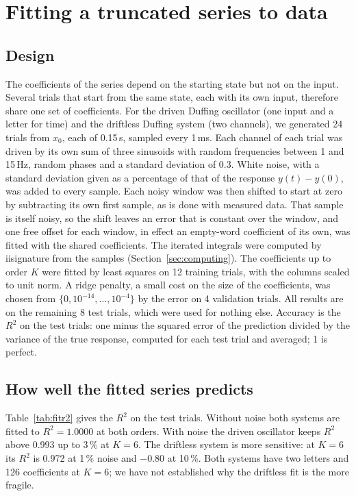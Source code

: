 \documentclass[11pt,a4paper]{article}
\theoremstyle{remark}
\begin{document}
\section{Fitting a truncated series to data}\label{sec:regression}
\subsection{Design}\label{sec:regression-design}
The coefficients of the series depend on the starting state but not on the input.
Several trials that start from the same state, each with its own input, therefore share one set of coefficients.
For the driven Duffing oscillator (one input and a letter for time) and the driftless Duffing system (two channels), we generated 24 trials from $x_0$, each of 0.15\,s, sampled every 1\,ms.
Each channel of each trial was driven by its own sum of three sinusoids with random frequencies between 1 and 15\,Hz, random phases and a standard deviation of 0.3.
White noise, with a standard deviation given as a percentage of that of the response $y(t)-y(0)$, was added to every sample.
Each noisy window was then shifted to start at zero by subtracting its own first sample, as is done with measured data.
That sample is itself noisy, so the shift leaves an error that is constant over the window, and one free offset for each window, in effect an empty-word coefficient of its own, was fitted with the shared coefficients.
The iterated integrals were computed by iisignature from the samples (Section~\ref{sec:computing}).
The coefficients up to order $K$ were fitted by least squares on 12 training trials, with the columns scaled to unit norm.
A ridge penalty, a small cost on the size of the coefficients, was chosen from $\{0,10^{-14},\dots,10^{-4}\}$ by the error on 4 validation trials.
All results are on the remaining 8 test trials, which were used for nothing else.
Accuracy is the $R^2$ on the test trials: one minus the squared error of the prediction divided by the variance of the true response, computed for each test trial and averaged; 1 is perfect.

\subsection{How well the fitted series predicts}
Table~\ref{tab:fitr2} gives the $R^2$ on the test trials.
Without noise both systems are fitted to $R^2=1.0000$ at both orders.
With noise the driven oscillator keeps $R^2$ above 0.993 up to 3\,\% at $K=6$.
The driftless system is more sensitive: at $K=6$ its $R^2$ is 0.972 at 1\,\% noise and $-0.80$ at 10\,\%.
Both systems have two letters and 126 coefficients at $K=6$; we have not established why the driftless fit is the more fragile.
\end{document}
